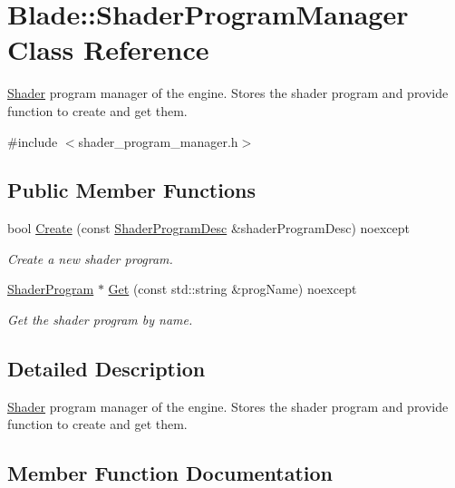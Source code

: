 \hypertarget{class_blade_1_1_shader_program_manager}{}\section{Blade\+:\+:Shader\+Program\+Manager Class Reference}
\label{class_blade_1_1_shader_program_manager}


\hyperlink{class_blade_1_1_shader}{Shader} program manager of the engine. Stores the shader program and provide function to create and get them.  




{\ttfamily \#include $<$shader\+\_\+program\+\_\+manager.\+h$>$}

\subsection*{Public Member Functions}
\begin{DoxyCompactItemize}
\item 
bool \hyperlink{class_blade_1_1_shader_program_manager_a8273a7106a27e3a75169fba65ac3902e}{Create} (const \hyperlink{struct_blade_1_1_shader_program_desc}{Shader\+Program\+Desc} \&shader\+Program\+Desc) noexcept
\begin{DoxyCompactList}\small\item\em Create a new shader program. \end{DoxyCompactList}\item 
\hyperlink{class_blade_1_1_shader_program}{Shader\+Program} $\ast$ \hyperlink{class_blade_1_1_shader_program_manager_a5e9744ef91a953b1ca5cc38160568804}{Get} (const std\+::string \&prog\+Name) noexcept
\begin{DoxyCompactList}\small\item\em Get the shader program by name. \end{DoxyCompactList}\end{DoxyCompactItemize}


\subsection{Detailed Description}
\hyperlink{class_blade_1_1_shader}{Shader} program manager of the engine. Stores the shader program and provide function to create and get them. 

\subsection{Member Function Documentation}
\mbox{\label{class_blade_1_1_shader_program_manager_a8273a7106a27e3a75169fba65ac3902e}} 
